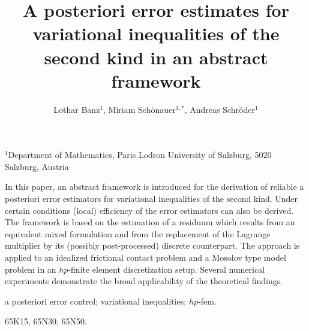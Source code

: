 \documentclass[12pt,twoside,reqno]{amsart}
\theoremstyle{definition}
\numberwithin{equation}{section}
\begin{document}
\setcounter{page}{1}







\vspace*{1.0cm}
\title[A posteriori error estimates for variational inequalities of the second kind]
{A posteriori error estimates for variational inequalities of the second kind in an abstract framework}
\author[L.~Banz, M.~Schönauer, A.~Schröder]{Lothar Banz$^1$, Miriam Schönauer$^{1,*}$, Andreas Schröder$^1$}
\maketitle
\vspace*{-0.6cm}


\begin{center}
{\footnotesize {\it

$^1$Department of Mathematics, Paris Lodron University of Salzburg, 5020 Salzburg, Austria


}}\end{center}



\vskip 4mm {\small{}
In this paper, an abstract framework is introduced for the derivation of reliable a posteriori error estimators for variational inequalities of the second kind. Under certain conditions (local) efficiency of the error estimators can also be derived. The framework is based on the estimation of a residuum which results from an equivalent mixed formulation and from the replacement of the Lagrange multiplier by its (possibly post-processed) discrete counterpart.
The approach is applied to an idealized frictional contact problem and a Mosolov type model problem in an $hp$-finite element discretization setup. Several numerical experiments demonstrate the broad applicability of the theoretical findings.


a posteriori error control; variational inequalities; $hp$-fem. 

65K15, 65N30, 65N50.

}




\renewcommand{\thefootnote}{}
\end{document}
